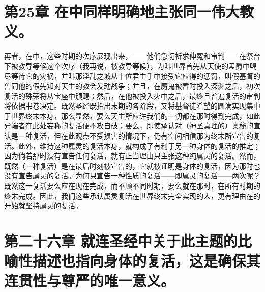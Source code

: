 
\section{第25章 在中同样明确地主张同一伟大教义。}

再者，在中，这些时期的次序展现出来，——他们急切祈求伸冤和审判——在祭台下被教导等候这个次序（我再说，被教导等候），为叫世界首先从天使的盂爵中喝尽等待它的灾祸，并叫那淫乱之城从十位君主手中接受它应得的惩罚，叫假基督的兽同他的假先知对天主的教会发动战争；并且，在魔鬼被暂时投入深渊之后，初次复活的殊荣将从宝座中颁赐；然后，在他被投入火中之后，最终且普遍复活的审判将依据书卷决定。既然圣经既指出末期的各阶段，又将基督徒希望的圆满实现集中于世界终末本身，那么显然，要么天主所应许我们的一切都在那时得到完成，如此异端者在此处妄称的复活便不攻自破；要么，即使承认对（神圣真理的）奥秘的宣认是一种复活，但在此观点不受损害的情况下，仍有空间相信那为终末所宣告的复活。此外，维持这种属灵的复活本身，就构成了有利于另一种身体的复活的推定；因为倘若那时没有宣告任何复活，就有正当理由只主张这种纯属灵的复活。然而，既然（一种复活）是在最后时刻被宣告的，它就被证明是身体的复活，因为那时也没有宣告属灵的复活。为何只宣告一种性质的复活——即属灵的复活——两次呢？既然这一复活要么应在现在完成，而不顾不同时期，要么就在那时，在所有时期的终末完成。因此，我们这些承认属灵复活在世界终末完全实现的人，更有理由在的开始就坚持属灵的复活。\par


\section{第二十六章 就连圣经中关于此主题的比喻性描述也指向身体的复活，这是确保其连贯性与尊严的唯一意义。}

